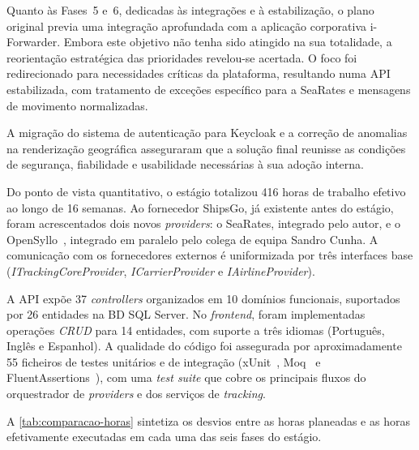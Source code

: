 \documentclass[a4paper,12pt]{report}
\begin{document}
Quanto às Fases~5 e~6, dedicadas às integrações e à estabilização, o plano original previa uma integração aprofundada com a aplicação corporativa i-Forwarder. Embora este objetivo não tenha sido atingido na sua totalidade, a reorientação estratégica das prioridades revelou-se acertada. O foco foi redirecionado para necessidades críticas da plataforma, resultando numa API estabilizada, com tratamento de exceções específico para a SeaRates e mensagens de movimento normalizadas.

A migração do sistema de autenticação para Keycloak e a correção de anomalias na renderização geográfica asseguraram que a solução final reunisse as condições de segurança, fiabilidade e usabilidade necessárias à sua adoção interna.

Do ponto de vista quantitativo, o estágio totalizou 416 horas de trabalho efetivo ao longo de 16 semanas. Ao fornecedor ShipsGo, já existente antes do estágio, foram acrescentados dois novos \textit{providers}: o SeaRates, integrado pelo autor, e o OpenSyllo~\cite{opensyllo}, integrado em paralelo pelo colega de equipa Sandro Cunha. A comunicação com os fornecedores externos é uniformizada por três interfaces base (\textit{ITrackingCoreProvider}, \textit{ICarrierProvider} e \textit{IAirlineProvider}).

A API expõe 37 \textit{controllers} organizados em 10 domínios funcionais, suportados por 26 entidades na BD SQL Server. No \textit{frontend}, foram implementadas operações \textit{CRUD} para 14 entidades, com suporte a três idiomas (Português, Inglês e Espanhol). A qualidade do código foi assegurada por aproximadamente 55 ficheiros de testes unitários e de integração (xUnit~\cite{xunit}, Moq~\cite{moq} e FluentAssertions~\cite{fluentassertions}), com uma \textit{test suite} que cobre os principais fluxos do orquestrador de \textit{providers} e dos serviços de \textit{tracking}.

A \autoref{tab:comparacao-horas} sintetiza os desvios entre as horas planeadas e as horas efetivamente executadas em cada uma das seis fases do estágio.
\end{document}
